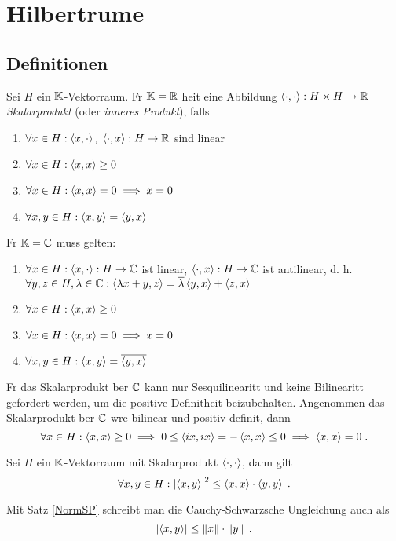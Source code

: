 \chapter{Hilbertr\as ume}
\section{Definitionen}
\begin{definition}
	Sei $H$ ein \(\mathbb{K}\)-Vektorraum. F\us r \(\mathbb{K} = \mathbb{R}\) hei\s t eine Abbildung \(\left\langle\cdot,\cdot\right\rangle: H \times H \to \mathbb{R}\) \textit{Skalarprodukt} (oder \textit{inneres Produkt}), falls
	\begin{enumerate}[noitemsep]
		\item \(\forall x \in H: \left\langle x, \cdot\right\rangle,\; \left\langle\cdot, x\right\rangle : H \to \mathbb{R}\) sind linear
		\item \(\forall x \in H: \left\langle x,x\right\rangle  \geq 0\)
		\item \(\forall x \in H: \left\langle x,x\right\rangle = 0 \implies x = 0\)
		\item \(\forall x, y \in H: \left\langle x,y\right\rangle = \left\langle y,x\right\rangle\)
	\end{enumerate}
	F\us r \(\mathbb{K} = \mathbb{C}\) muss gelten:
	\begin{enumerate}[noitemsep]
		\item \(\forall x \in H: \left\langle x, \cdot\right\rangle: H \to \mathbb{C}\) ist linear, \(\left\langle\cdot,x\right\rangle: H \to \mathbb{C}\) ist antilinear, d. h. 
		\(\forall y, z \in H, \lambda \in \mathbb{C}: \left\langle\lambda x + y, z\right\rangle = \overline \lambda \left\langle y,x\right\rangle + \left\langle z,x\right\rangle\)
		\item \(\forall x \in H: \left\langle x,x\right\rangle  \geq 0\)
		\item \(\forall x \in H: \left\langle x,x\right\rangle = 0 \implies x = 0\)
		\item \(\forall x, y \in H: \left\langle x,y\right\rangle = \overline{\left\langle y,x\right\rangle}\)
	\end{enumerate}
\end{definition}

\begin{rem}
	F\us r das Skalarprodukt \us ber $\mathbb{C}$ kann nur Sesquilinearit\as t und keine Bilinearit\as t gefordert werden, um die positive Definitheit beizubehalten. Angenommen das Skalarprodukt \us ber $\mathbb{C}$ w\as re bilinear und positiv definit, dann 
	\[\forall x \in H: \left\langle x,x\right\rangle \geq 0 \implies 0 \leq \left\langle ix, ix\right\rangle = - \left\langle x,x\right\rangle \leq 0 \implies \left\langle x,x\right\rangle = 0 \;.\]
\end{rem}

\begin{theorem}
	Sei $H$ ein \(\mathbb{K}\)-Vektorraum mit Skalarprodukt \(\left\langle\cdot, \cdot\right\rangle\), dann gilt
	\[\forall x, y \in H: \left\lvert \left\langle x,y\right\rangle \right\rvert^2 \leq \left\langle x,x\right\rangle \cdot \left\langle y,y\right\rangle\;.\]
	\label{CauchySchwarz}
\end{theorem}
\begin{rem}
	Mit Satz \ref{NormSP} schreibt man die Cauchy-Schwarzsche Ungleichung auch als 
	\[\left\lvert \left\langle x,y\right\rangle \right\rvert \leq \left\lVert x\right\rVert \cdot \left\lVert y\right\rVert\;.\]
\end{rem}

